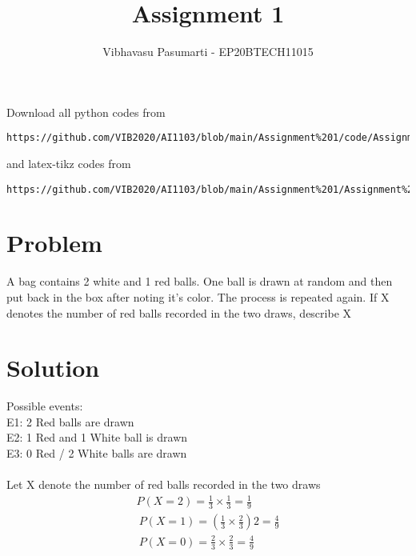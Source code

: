 \documentclass[journal,12pt,twocolumn]{IEEEtran}
\begin{document}
\title{Assignment 1}
\author{Vibhavasu Pasumarti - EP20BTECH11015}
\maketitle
\newpage
\bigskip
\renewcommand{\thefigure}{\theenumi}
\renewcommand{\thetable}{\theenumi}
Download all python codes from 
\begin{lstlisting}
https://github.com/VIB2020/AI1103/blob/main/Assignment%201/code/Assignment_1.py
\end{lstlisting}
%
and latex-tikz codes from 
%
\begin{lstlisting}
https://github.com/VIB2020/AI1103/blob/main/Assignment%201/Assignment%201.tex
\end{lstlisting}
\section{Problem}
A bag contains 2 white and 1 red balls. One ball is 
drawn at random and then put back in the box after 
noting it's color. The process is repeated again. 
If X denotes the number of red balls recorded in the
two draws, describe X
\section{Solution}

Possible events:\\
E1: 2 Red balls are drawn\\
E2: 1 Red and 1 White ball is drawn\\
E3: 0 Red / 2 White balls are drawn\\\\
Let X denote the number of red balls recorded in 
the two draws\\
\begin{align}
P(X = 2) = \frac{1}{3} \times \frac{1}{3} = \frac{1}{9}\\\
P(X = 1) = \left(\frac{1}{3} \times \frac{2}{3}\right) 2 = \frac{4}{9}\\\
P(X = 0) = \frac{2}{3} \times \frac{2}{3} = \frac{4}{9}
\end{align}
\end{document}
